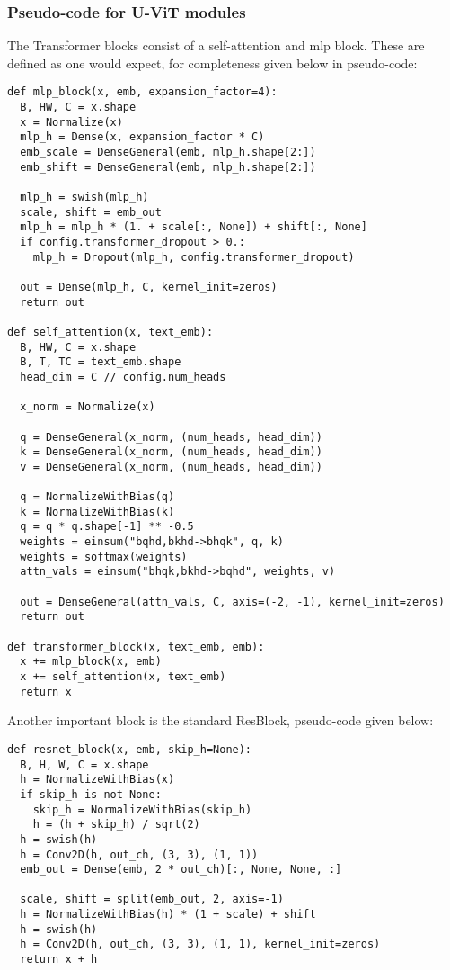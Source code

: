 \documentclass[nohyperref]{article}
\theoremstyle{plain}
\theoremstyle{definition}
\theoremstyle{remark}
\begin{document}
\subsubsection{Pseudo-code for U-ViT modules}
The Transformer blocks consist of a self-attention and mlp block. These are defined as one would expect, for completeness given below in pseudo-code:
\begin{lstlisting}[style=python]
def mlp_block(x, emb, expansion_factor=4):
  B, HW, C = x.shape 
  x = Normalize(x)
  mlp_h = Dense(x, expansion_factor * C)
  emb_scale = DenseGeneral(emb, mlp_h.shape[2:])
  emb_shift = DenseGeneral(emb, mlp_h.shape[2:])

  mlp_h = swish(mlp_h)
  scale, shift = emb_out
  mlp_h = mlp_h * (1. + scale[:, None]) + shift[:, None]
  if config.transformer_dropout > 0.:
    mlp_h = Dropout(mlp_h, config.transformer_dropout)

  out = Dense(mlp_h, C, kernel_init=zeros)
  return out
  
def self_attention(x, text_emb):
  B, HW, C = x.shape
  B, T, TC = text_emb.shape
  head_dim = C // config.num_heads

  x_norm = Normalize(x)

  q = DenseGeneral(x_norm, (num_heads, head_dim))
  k = DenseGeneral(x_norm, (num_heads, head_dim))
  v = DenseGeneral(x_norm, (num_heads, head_dim))

  q = NormalizeWithBias(q)
  k = NormalizeWithBias(k)
  q = q * q.shape[-1] ** -0.5
  weights = einsum("bqhd,bkhd->bhqk", q, k)
  weights = softmax(weights)
  attn_vals = einsum("bhqk,bkhd->bqhd", weights, v)

  out = DenseGeneral(attn_vals, C, axis=(-2, -1), kernel_init=zeros)
  return out
  
def transformer_block(x, text_emb, emb):
  x += mlp_block(x, emb)
  x += self_attention(x, text_emb)
  return x
\end{lstlisting}


Another important block is the standard ResBlock, pseudo-code given below:
\begin{lstlisting}[style=python]
def resnet_block(x, emb, skip_h=None):
  B, H, W, C = x.shape
  h = NormalizeWithBias(x)
  if skip_h is not None:
    skip_h = NormalizeWithBias(skip_h)
    h = (h + skip_h) / sqrt(2)
  h = swish(h)
  h = Conv2D(h, out_ch, (3, 3), (1, 1))
  emb_out = Dense(emb, 2 * out_ch)[:, None, None, :]

  scale, shift = split(emb_out, 2, axis=-1)
  h = NormalizeWithBias(h) * (1 + scale) + shift
  h = swish(h)
  h = Conv2D(h, out_ch, (3, 3), (1, 1), kernel_init=zeros)
  return x + h
\end{lstlisting}
\end{document}
